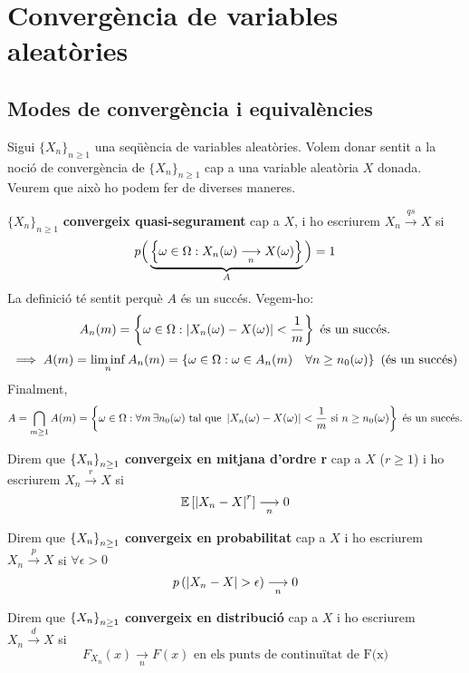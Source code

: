 \section{Convergència de variables aleatòries}

\subsection{Modes de convergència i equivalències}

Sigui $\{X_n\}_{n\geq1}$ una seqüència de variables aleatòries. Volem donar sentit a la noció de 
convergència de $\{X_n\}_{n\geq1}$ cap a una variable aleatòria $X$ donada.\\
Veurem que això ho podem fer de diverses maneres.

\begin{defi}
  $\{X_n\}_{n\geq1}$ \textbf{convergeix quasi-segurament} cap a $X$, i ho  escriurem $X_n 
  \overset{qs}{\longrightarrow} X$ si
  \[
    p\Big(\underbrace{\left\{\omega \in \Omega : X_n(\omega)\underset{n}{\longrightarrow}X(\omega)\right\}}_{A}\Big) = 1
  \]
  La definició té sentit perquè $A$ és un succés. Vegem-ho:
  \[
    A_n(m) = \left\{\omega \in \Omega : \left\vert X_n(\omega) - X(\omega) \right\vert < \frac{1}{m}\right\} \text{ és un succés.}
  \]
  \[
    \implies A(m) = \liminf_n A_n(m) = \left\{\omega \in \Omega : \omega \in A_n(m) \quad 
    \forall n \geq n_0(\omega)\right\} \text{ (és un succés)}
  \]
  Finalment,
  \[
    A = \bigcap_{m\geq1}A(m) = \left\{\omega\in\Omega : \forall m \, \exists n_0(\omega) 
    \text{ tal que } \left\vert X_n(\omega) - X(\omega) \right\vert < \frac{1}{m} \text{ si } n \geq n_0(\omega)\right\} \text{ és un succés.}
  \]
\end{defi}

\begin{defi}
  Direm que $\left\{X_n\right\}_{n\geq1}$ \textbf{convergeix en mitjana d'ordre r} cap a $X$ 
  ($r \geq 1$) i ho escriurem $X_n \overset{r}{\longrightarrow} X$ si
  \[
    \mathbb{E}\left[\left\vert X_n - X \right\vert^r\right] \underset{n}{\longrightarrow} 0
  \]
\end{defi}

\begin{defi}
  Direm que $\left\{X_n\right\}_{n\geq1}$ \textbf{convergeix en probabilitat} cap a $X$ i ho escriurem 
  $X_n \overset{p}{\longrightarrow} X$ si $\forall \epsilon > 0$
  \[
    p\left(\left\vert X_n - X \right\vert > \epsilon \right) \underset{n}{\longrightarrow} 0
  \]
\end{defi}

\begin{defi}
  Direm que $\left\{X_n\right\}_{n\geq1}$ \textbf{convergeix en distribució} cap a $X$ i ho escriurem 
  $X_n \overset{d}{\longrightarrow} X$ si
  \[
    F_{X_n}(x) \underset{n}{\longrightarrow} F(x) \text{ en els punts de continuïtat de F(x)}
  \]
\end{defi}

